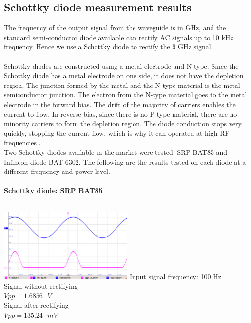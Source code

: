 \documentclass[12pt,a4paper,bold]{thesis}
\theoremstyle{thm}
\theoremstyle{definition}
\begin{document}
\subsection{Schottky diode measurement results}
\indent\indent\indent The frequency of the output signal from the waveguide is in GHz, and the standard semi-conductor diode available can rectify AC signals up to 10 kHz frequency. Hence we use a Schottky diode to rectify the 9 GHz signal. 
\\\\
Schottky diodes are constructed using a metal electrode and N-type. Since the Schottky diode has a metal electrode on one side, it does not have the depletion region. The junction formed by the metal and the N-type material is the metal-semiconductor junction. The electron from the N-type material goes to the metal electrode in the forward bias. The drift of the majority of carriers enables the current to flow. In reverse bias, since there is no P-type material, there are no minority carriers to form the depletion region. The diode conduction stops very quickly, stopping the current flow, which is why it can operated at high RF frequencies .
\\
Two Schottky diodes available in the market were tested, SRP BAT85 and Infineon diode BAT 6302. The following are the results tested on each diode at a different frequency and power level. \\\\
\textbf{Schottky diode: SRP BAT85 }\\\\
\begin{minipage}[b]{0.48\linewidth}
\includegraphics[width=6.7cm]{Images/Amazon/LF100Hz.png}  
Input signal frequency: 100 Hz\\
Signal without rectifying\\
$Vpp = 1.6856\text{ }V$\\
Signal after rectifying\\
$Vpp = 135.24\text{ }mV$\\
\end{minipage}
\hfill
\end{document}
